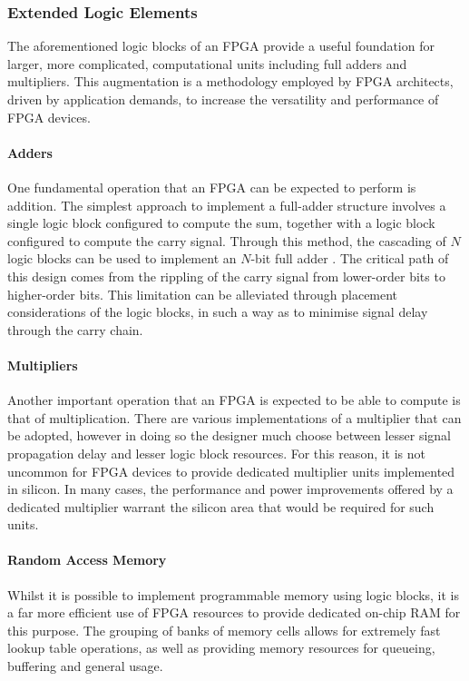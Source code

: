 \subsubsection{Extended Logic Elements}
\label{fpga:architecture:extendedLogic}
The aforementioned logic blocks of an \gls{FPGA} provide a useful foundation for
larger, more complicated, computational units including full adders and
multipliers. This augmentation is a methodology employed by \gls{FPGA}
architects, driven by application demands, to increase the versatility and
performance of \gls{FPGA} devices.

\paragraph{Adders}
\label{fpga:architecture:adders}
One fundamental operation that an \gls{FPGA} can be expected to perform is
addition. The simplest approach to implement a full-adder structure involves a
single logic block configured to compute the sum, together with a logic block
configured to compute the carry signal. Through this method, the cascading of
$N$ logic blocks can be used to implement an $N$-bit full adder
\cite{Hauck:2007}. The critical path of this design comes from the rippling
of the carry signal from lower-order bits to higher-order bits. This limitation
can be alleviated through placement considerations of the logic blocks, in such
a way as to minimise signal delay through the carry chain.

\paragraph{Multipliers}
\label{fpga:architecture:multipliers}
Another important operation that an \gls{FPGA} is expected to be able to compute
is that of multiplication. There are various implementations of a multiplier
that can be adopted, however in doing so the designer much choose between
lesser signal propagation delay and lesser logic block resources. For this
reason, it is not uncommon for \gls{FPGA} devices to provide dedicated
multiplier units implemented in silicon. In many cases, the performance and
power improvements offered by a dedicated multiplier warrant the silicon area
that would be required for such units.

\paragraph{Random Access Memory}
\label{fpga:architecture:ram}
Whilst it is possible to implement programmable memory using logic blocks,
it is a far more efficient use of FPGA resources to provide dedicated on-chip
\gls{RAM} for this purpose. The grouping of banks of memory cells allows for
extremely fast lookup table operations, as well as providing memory resources
for queueing, buffering and general usage.

